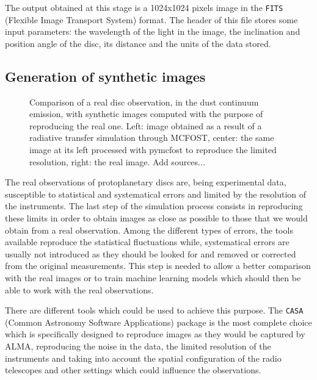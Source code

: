 \documentclass[a4paper,10pt]{report}
\begin{document}
The output obtained at this stage is a 1024x1024 pixels image in the
\lstinline{FITS} (Flexible Image Transport System) format.
The header of this file stores some input parameters: 
the wavelength of the light in the image, the inclination and position angle of
the disc, its distance and the units of the data stored.

\subsection{Generation of synthetic images}

\begin{figure}
    \begin{center}
        \scalebox{0.45}{}
    \end{center}
    \caption{Comparison of a real disc observation, in the dust continuum emission,
    with synthetic images computed with the purpose of reproducing the real one.
    Left: image obtained as a result of a radiative transfer simulation through MCFOST,
    center: the same image at its left processed with pymcfost to reproduce the limited
    resolution, right: the real image. Add sources...}
\end{figure}

The real observations of protoplanetary discs are, being experimental data, susceptible 
to statistical and systematical errors and limited by the resolution of the instruments.
The last step of the simulation process consists in reproducing these limits in order
to obtain images as close as possible to those that we would obtain from a real observation.
Among the different types of errors, the tools available reproduce the
statistical fluctuations while, systematical errors are usually not introduced as they should be 
looked for and removed or corrected from the original measurements.
This step is needed to allow a better comparison with the real images or to train machine learning 
models which should then be able to work with the real observations.

There are different tools which could be used to achieve this purpose.
The \lstinline{CASA} (Common Astronomy Software Applications) package is the most complete choice 
which is specifically designed to reproduce images as they would be captured by ALMA, reproducing the noise in the data,
the limited resolution of the instruments and taking into account the spatial configuration of the radio telescopes
and other settings which could influence the observations.
\end{document}
